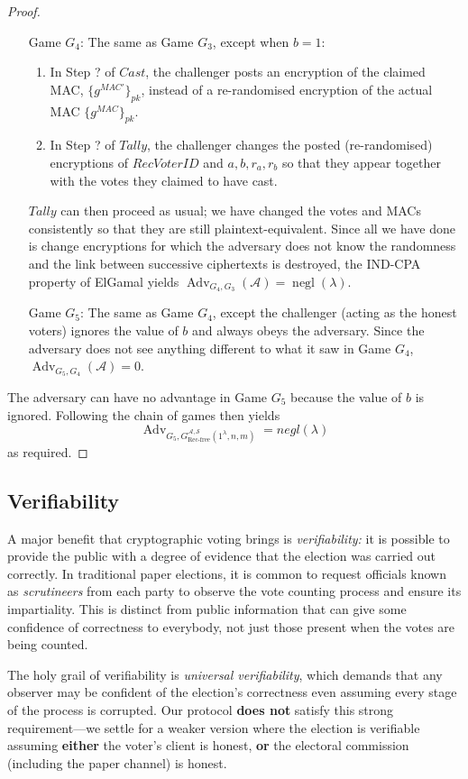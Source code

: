\documentclass[12pt,a4paper]{article}
\DeclareMathOperator{\negl}{\text{negl}}
\DeclareMathOperator{\Adv}{\text{Adv}}
\theoremstyle{definition}
\newcommand{\receivedvid}{\mathit{RecVoterID}}
\newcommand{\Mac}{\mathit{MAC}}
\newcounter{protocol}
\begin{document}
\begin{proof}
\begin{itemize}[leftmargin=4em]
        \item[Game] $G_4$: The same as Game $G_3$, except when $b = 1$:
        \begin{enumerate}
            \item In Step ? of $\mathit{Cast}$, the challenger posts an encryption of the claimed MAC, $\{g^{\Mac'}\}_{pk}$, instead of a re-randomised encryption of the actual MAC $\{g^\Mac\}_{pk}$.
            \item In Step ? of $\mathit{Tally}$, the challenger changes the posted (re-randomised) encryptions of $\receivedvid$ and $a, b, r_a, r_b$ so that they appear together with the votes they claimed to have cast.
        \end{enumerate}
        $\mathit{Tally}$ can then proceed as usual; we have changed the votes and MACs consistently so that they are still plaintext-equivalent. Since all we have done is change encryptions for which the adversary does not know the randomness and the link between successive ciphertexts is destroyed, the IND-CPA property of ElGamal yields $\Adv_{G_4, G_3}(\mathcal{A})=\negl(\lambda)$.
    
        \item[Game] $G_5$: The same as Game $G_4$, except the challenger (acting as the honest voters) ignores the value of $b$ and always obeys the adversary. Since the adversary does not see anything different to what it saw in Game $G_4$, $\Adv_{G_5, G_4}(\mathcal{A})=0$.
    \end{itemize}
    The adversary can have no advantage in Game $G_5$ because the value of $b$ is ignored. Following the chain of games then yields
        $$\Adv_{G_5, G^{\mathcal{A},\mathcal{S}}_\text{Rec-free}(1^\lambda,n,m)}=negl(\lambda)$$
    as required.
\end{proof}
\subsection{Verifiability}
A major benefit that cryptographic voting brings is \textit{verifiability:} it is possible to provide the public with a degree of evidence that the election was carried out correctly. In traditional paper elections, it is common to request officials known as \textit{scrutineers} from each party to observe the vote counting process and ensure its impartiality. This is distinct from public information that can give some confidence of correctness to everybody, not just those present when the votes are being counted.

The holy grail of verifiability is \textit{universal verifiability}, which demands that any observer may be confident of the election's correctness even assuming every stage of the process is corrupted. Our protocol \textbf{does not} satisfy this strong requirement---we settle for a weaker version where the election is verifiable assuming \textbf{either} the voter's client is honest, \textbf{or} the electoral commission (including the paper channel) is honest.
\end{document}
